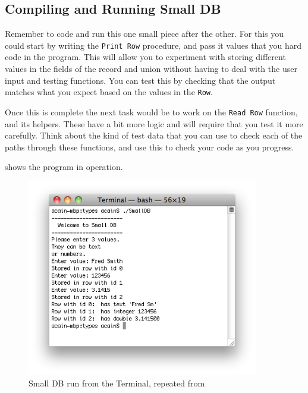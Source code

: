 
\clearpage
\subsection{Compiling and Running Small DB} %
\label{sub:compiling_and_running_small_db}

Remember to code and run this one small piece after the other. For this you could start by writing the \texttt{Print Row} procedure, and pass it values that you hard code in the program. This will allow you to experiment with storing different values in the fields of the record and union without having to deal with the user input and testing functions. You can test this by checking that the output matches what you expect based on the values in the \texttt{Row}.

Once this is complete the next task would be to work on the \texttt{Read Row} function, and its helpers. These have a bit more logic and will require that you test it more carefully. Think about the kind of test data that you can use to check each of the paths through these functions, and use this to check your code as you progress.

 shows the program in operation.

\begin{figure}[h]
   \centering
   \includegraphics[width=0.9\textwidth]{./topics/type-decl/images/SmallDB} 
   \caption{Small DB run from the Terminal, repeated from }
   \label{fig:small-db-using}
\end{figure}


